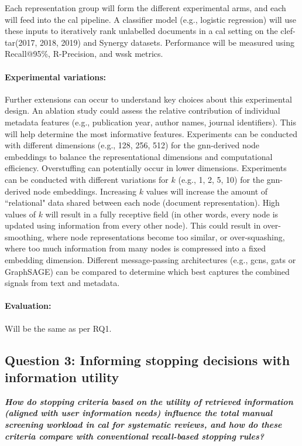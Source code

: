 \documentclass[10pt,oneside]{book}
\begin{document}
Each representation group will form the different experimental arms, and each will feed into the \gls*{cal} pipeline. A classifier model (e.g., logistic regression) will use these inputs to iteratively rank unlabelled documents in a \gls*{cal} setting on the \gls*{clef}-\gls*{tar}(2017, 2018, 2019) and Synergy datasets.  Performance will be measured using Recall@95\%, R-Precision, and \gls*{wssk} metrics.

\paragraph{Experimental variations:}
Further extensions can occur to understand key choices about this experimental design. An ablation study could assess the relative contribution of individual metadata features (e.g., publication year, author names, journal identifiers). This will help determine the most informative features. Experiments can be conducted with different dimensions (e.g., 128, 256, 512) for the \gls*{gnn}-derived node embeddings to balance the representational dimensions and computational efficiency. Overstuffing can potentially occur in lower dimensions. Experiments can be conducted with different variations for $k$ (e.g., 1, 2, 5, 10) for the \gls*{gnn}-derived node embeddings. Increasing $k$ values will increase the amount of ``relational" data shared between each node (document representation). High values of $k$ will result in a fully receptive field (in other words, every node is updated using information from every other node). This could result in over-smoothing, where node representations become too similar, or over-squashing, where too much information from many nodes is compressed into a fixed embedding dimension. Different message-passing architectures (e.g., \glspl*{gcn}, \glspl*{gat} or GraphSAGE) can be compared to determine which best captures the combined signals from text and metadata.

\paragraph{Evaluation:}
Will be the same as per RQ1. 

\subsection{Question 3: Informing stopping decisions with information utility}

\begin{tcolorbox}[colback=salmon!10, colframe=salmon, sharp corners=southwest, boxrule=0.8pt]
\emph{\textbf{How do stopping criteria based on the utility of retrieved information (aligned with user information needs) influence the total manual screening workload in \gls*{cal} for systematic reviews, and how do these criteria compare with conventional recall-based stopping rules?}}
\end{tcolorbox}
\end{document}
